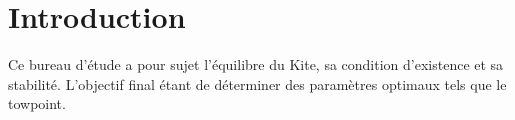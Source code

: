 \chapter{Introduction}
\label{ch:Ch0}

Ce bureau d'étude a pour sujet l'équilibre du Kite, sa condition d'existence et sa stabilité. L'objectif final étant de déterminer des paramètres optimaux tels que le towpoint.